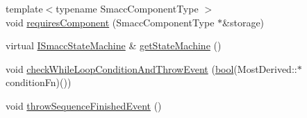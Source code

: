 \begin{DoxyCompactItemize}
\item 
{\footnotesize template$<$typename Smacc\+Component\+Type $>$ }\\void \hyperlink{classsmacc_1_1SmaccState_a2febb778d5c3d80b9c034576b5a92b65}{requires\+Component} (Smacc\+Component\+Type $\ast$\&storage)
\item 
virtual \hyperlink{classsmacc_1_1ISmaccStateMachine}{I\+Smacc\+State\+Machine} \& \hyperlink{classsmacc_1_1SmaccState_afc39f8e0ca4001b2159a100da2fccd0e}{get\+State\+Machine} ()
\item 
void \hyperlink{classsmacc_1_1SmaccState_a80082718f226bebedb589f0c4696001d}{check\+While\+Loop\+Condition\+And\+Throw\+Event} (\hyperlink{classbool}{bool}(Most\+Derived\+::$\ast$condition\+Fn)())
\item 
void \hyperlink{classsmacc_1_1SmaccState_a49dcfc25824f7e083dd4b999c49ab2b6}{throw\+Sequence\+Finished\+Event} ()
\end{DoxyCompactItemize}
